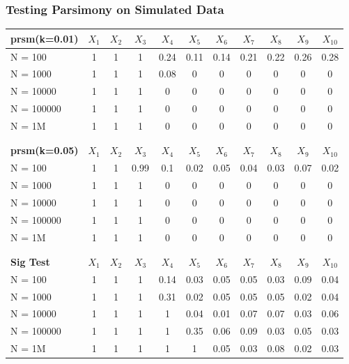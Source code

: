 \documentclass{beamer}
\begin{document}
\begin{frame}
\frametitle{Testing Parsimony on Simulated Data}

\begin{tabular}{| l | c | c | c | c | c | c | c | c | c | c |}



\hline
\textbf{prsm(k=0.01)}&	$X_1$&	$X_2$&	$X_3$&	$X_4$&	$X_5$&	$X_6$&	$X_7$&	$X_8$&	$X_9$&	$X_{10}$\\
\hline
N = 100&			1&	1&	1&	0.24&	0.11&	0.14&	0.21&	0.22&	0.26&	0.28 	\\
N = 1000&			1&	1&	1&	0.08&	0&	0&	0&	0&	0&	0	\\
N = 10000&			1&	1&	1&	0&	0&	0&	0&	0&	0&	0	\\
N = 100000&		1&	1&	1&	0&	0&	0&	0&	0&	0&	0	\\
N = 1M&			1&	1&	1&	0&	0&	0&	0&	0&	0&	0	\\
\hline		

\\
								
									\\		
\hline					
\textbf{prsm(k=0.05)}&	$X_1$&	$X_2$&	$X_3$&	$X_4$&	$X_5$&	$X_6$&	$X_7$&	$X_8$&	$X_9$&	$X_{10}$\\
\hline
N = 100&			1&	1&	0.99&	0.1&	0.02&	0.05&	0.04&	0.03&	0.07&	0.02	\\
N = 1000&			1&	1&	1&	0&	0&	0&	0&	0&	0&	0	\\
N = 10000&			1&	1&	1&	0&	0&	0&	0&	0&	0&	0	\\
N = 100000&		1&	1&	1&	0&	0&	0&	0&	0&	0&	0	\\
N = 1M&			1&	1&	1&	0&	0&	0&	0&	0&	0&	0	\\
\hline
\\

								
											\\
\hline
\textbf{Sig Test}&	$X_1$&	$X_2$&	$X_3$&	$X_4$&	$X_5$&	$X_6$&	$X_7$&	$X_8$&	$X_9$&	$X_{10}$\\
\hline
N = 100&		1&	1&	1&	0.14&	0.03&	0.05&	0.05&	0.03&	0.09&	0.04	\\
N = 1000&		1&	1&	1&	0.31&	0.02&	0.05&	0.05&	0.05&	0.02&	0.04	\\
N = 10000&		1&	1&	1&	1&	0.04&	0.01&	0.07&	0.07&	0.03&	0.06	\\
N = 100000&	1&	1&	1&	1&	0.35&	0.06&	0.09&	0.03&	0.05&	0.03	\\
N = 1M&		1&	1&	1&	1&	1&	0.05&	0.03&	0.08&	0.02&	0.03	\\
\hline
\end{tabular}


\end{frame}
\end{document}
